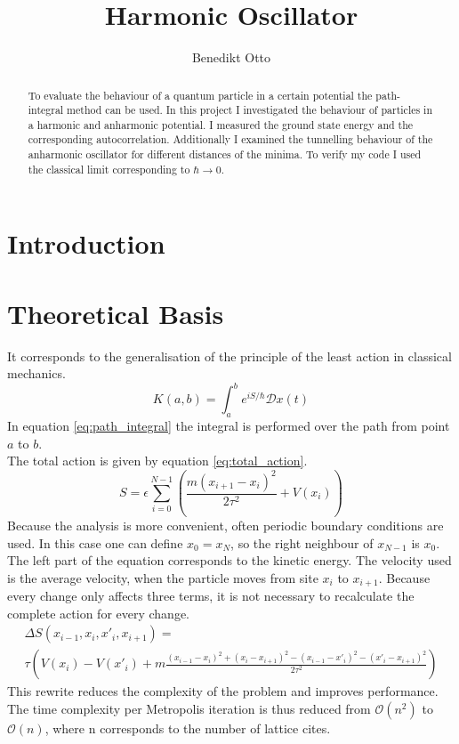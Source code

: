 \documentclass{article}
\title{Harmonic Oscillator}
\author{Benedikt Otto}
\begin{document}
	\maketitle
	\newpage
	\tableofcontents
	\newpage
	\begin{abstract}
		To evaluate the behaviour of a quantum particle in a certain potential the path-integral method can be used.
		In this project I investigated the behaviour of particles in a harmonic and anharmonic potential.
		I measured the ground state energy and the corresponding autocorrelation.
		Additionally I examined the tunnelling behaviour of the anharmonic oscillator for different distances of the minima.
		To verify my code I used the classical limit corresponding to $\hbar \rightarrow 0$.
	\end{abstract}
	\section{Introduction}
	\section{Theoretical Basis}
		It corresponds to the generalisation of the principle of the least action in classical mechanics.
		\begin{equation}
			K(a, b) = \int_a^b e^{iS/\hbar} \mathcal Dx(t)
			\label{eq:path_integral}
		\end{equation}
		In equation \ref{eq:path_integral} the integral is performed over the path from point $a$ to $b$.
		\\
		The total action is given by equation \ref{eq:total_action}.
		\begin{equation}
			S = \epsilon \sum_{i=0}^{N - 1} \left(\frac{m(x_{i+1} - x_i)^2}{2\tau^2} + V(x_i)\right)
			\label{eq:total_action}
		\end{equation}
		Because the analysis is more convenient, often periodic boundary conditions are used.
		In this case one can define $x_0 = x_N$, so the right neighbour of $x_{N-1}$ is $x_0$.
		The left part of the equation corresponds to the kinetic energy.
		The velocity used is the average velocity, when the particle moves from site $x_i$ to $x_{i+1}$.
		Because every change only affects three terms, it is not necessary to recalculate the complete action for every change.
		\begin{equation}
			\begin{split}
				\Delta S(x_{i-1}, x_i, x'_i, x_{i+1}) =\\
				\tau\left(V(x_i) - V(x'_i) + m\frac{(x_{i-1} - x_i)^2 + (x_i - x_{i+1})^2 - (x_{i-1} - x'_i)^2 - (x'_i - x_{i+1})^2}{2\tau^2}\right)
			\end{split}
			\label{eq:delta_total_action}
		\end{equation}
		This rewrite reduces the complexity of the problem and improves performance.
		The time complexity per Metropolis iteration is thus reduced from $\mathcal O(n^2)$ to $\mathcal O(n)$, where n corresponds to the number of lattice cites.
\end{document}
